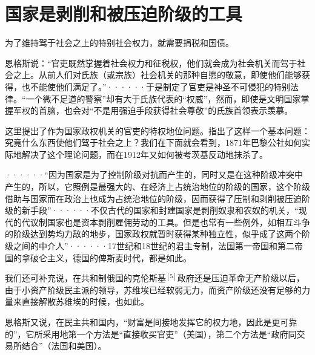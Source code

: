 \chapter{国家是剥削和被压迫阶级的工具} %

为了维持驾于社会之上的特别社会权力，就需要捐税和国债。

\pskip
\leftskip=10mm
\small

恩格斯说：“官吏既然掌握着社会权力和征税权，他们就会成为社会机关而驾于社会之上。从前人们对氏族（或宗族）社会机关的那种自愿的敬意，即使他们能够获得，也不能使他们满足了。”······于是制定了官吏是神圣不可侵犯的特别法律。“一个微不足道的警察”却有大于氏族代表的“权威”，然而，即使是文明国家掌握军权的首脑，也会对“不是用强迫手段获得社会尊敬”的氏族首领表示羡慕。

\leftskip=0mm
\normalsize
\pskip

这里提出了作为国家政权机关的官吏的特权地位问题。指出了这样一个基本问题：究竟什么东西使他们驾于社会之上？我们在下面就会看到，1871年巴黎公社如何实际地解决了这个理论问题，而在1912年又如何被考茨基反动地抹杀了。

\pskip
\leftskip=10mm
\small

······“因为国家是为了控制阶级对抗而产生的，同时又是在这种阶级冲突中产生的，所以，它照例是最强大的、在经济上占统治地位的阶级的国家，这个阶级借助与国家而在政治上也成为占统治地位的阶级，因而获得了压制和剥削被压迫阶级的新手段”······不仅古代的国家和封建国家是剥削奴隶和农奴的机关，“现代的代议制国家也是资本剥削雇佣劳动的工具。但是也常有一些例外，如相互斗争的阶级达到势均力敌的地步，国家政权就暂时获得某种独立性，似乎成了这两个阶级之间的中介人”······17世纪和18世纪的君主专制，法国第一帝国和第二帝国的拿破仑主义，德国的俾斯麦时代，都是如此。

\leftskip=0mm
\normalsize
\pskip

我们还可补充说，在共和制俄国的克伦斯基$^{[5]}$政府还是压迫革命无产阶级以后，由于小资产阶级民主派的领导，苏维埃{\kaishu 已经}软弱无力，而资产阶级{\kaishu 还}没有足够的力量来直接解散苏维埃的时候，也如此。

\pskip
\leftskip=10mm
\small

恩格斯又说，在民主共和国内，“财富是间接地发挥它的权力地，因此是更可靠的”，它所采用地第一个方法是“直接收买官吏”（美国），第二个方法是“政府同交易所结合”（法国和美国）。

